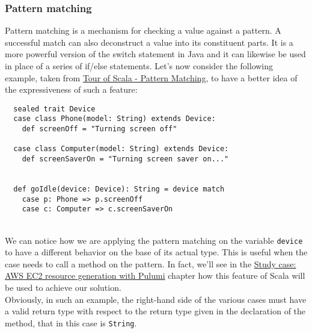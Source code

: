 \subsubsection{Pattern matching}
Pattern matching is a mechanism for checking a value against a pattern.
A successful match can also deconstruct a value into its constituent parts.
It is a more powerful version of the switch statement in Java and it can likewise be used in place of a series of if/else statements.
Let's now consider the following example, taken from \href{https://docs.scala-lang.org/tour/pattern-matching.html#}{Tour of Scala - Pattern Matching}, to have a better idea of the expressiveness of such a feature:
\begin{verbatim}
  sealed trait Device
  case class Phone(model: String) extends Device:
    def screenOff = "Turning screen off"

  case class Computer(model: String) extends Device:
    def screenSaverOn = "Turning screen saver on..."


  def goIdle(device: Device): String = device match
    case p: Phone => p.screenOff
    case c: Computer => c.screenSaverOn
\end{verbatim}\mbox{}\\
We can notice how we are applying the pattern matching on the variable \texttt{device} to have a different behavior on the base of its actual type.
This is useful when the case needs to call a method on the pattern.
In fact, we'll see in the \hyperref[cap:case-study]{Study case: AWS EC2 resource generation with Pulumi} chapter how this feature of Scala will be used to achieve our solution.\\
Obviously, in such an example, the right-hand side of the various cases must have a valid return type with respect to the return type given in the declaration of the method, that in this case is \texttt{String}.

